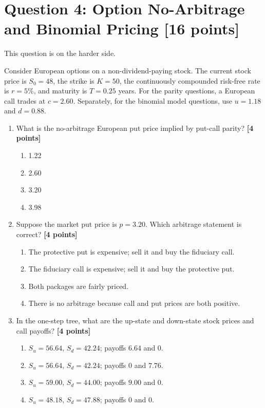 \documentclass[11pt]{article}
\newcommand{\pts}[1]{\hspace{0.35em}\textnormal{\textbf{[#1 points]}}}
\newenvironment{choices}{\begin{enumerate}[label=\Alph*.,leftmargin=2.2em,itemsep=0.12em,topsep=0.12em]}{\end{enumerate}}
\begin{document}
\section*{Question 4: Option No-Arbitrage and Binomial Pricing \pts{16}}

This question is on the harder side.

Consider European options on a non-dividend-paying stock. The current stock
price is $S_0=48$, the strike is $K=50$, the continuously compounded risk-free
rate is $r=5\%$, and maturity is $T=0.25$ years. For the parity questions, a
European call trades at $c=2.60$. Separately, for the binomial model questions,
use $u=1.18$ and $d=0.88$.

\begin{enumerate}
    \item What is the no-arbitrage European put price implied by put-call
    parity? \pts{4}
    \begin{choices}
        \item 1.22
        \item 2.60
        \item 3.20
        \item 3.98
    \end{choices}

    \item Suppose the market put price is $p=3.20$. Which arbitrage statement is
    correct? \pts{4}
    \begin{choices}
        \item The protective put is expensive; sell it and buy the fiduciary call.
        \item The fiduciary call is expensive; sell it and buy the protective put.
        \item Both packages are fairly priced.
        \item There is no arbitrage because call and put prices are both positive.
    \end{choices}

    \item In the one-step tree, what are the up-state and down-state stock
    prices and call payoffs? \pts{4}
    \begin{choices}
        \item $S_u=56.64$, $S_d=42.24$; payoffs $6.64$ and $0$.
        \item $S_u=56.64$, $S_d=42.24$; payoffs $0$ and $7.76$.
        \item $S_u=59.00$, $S_d=44.00$; payoffs $9.00$ and $0$.
        \item $S_u=48.18$, $S_d=47.88$; payoffs $0$ and $0$.
    \end{choices}


\end{enumerate}
\end{document}
